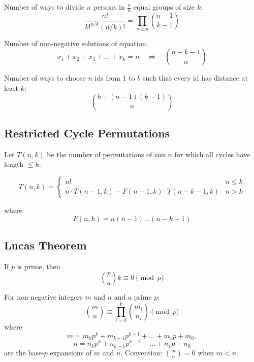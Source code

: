 \documentclass{article}
\begin{document}
Number of ways to divide $n$ persons in $\tfrac{n}{k}$ equal groups of size $k$:
\[
\frac{n!}{k!^{n/k}(n/k)!} = \prod_{n \geq k} \binom{n-1}{k-1}
\]

Number of non-negative solutions of equation:
\[
x_1+x_2+x_3+\dots+x_k=n \quad \Rightarrow \quad \binom{n+k-1}{n}
\]

Number of ways to choose $n$ ids from $1$ to $b$ such that every id has distance at least $k$:
\[
\binom{b-(n-1)(k-1)}{n}
\]


\subsection*{Restricted Cycle Permutations}

Let $T(n,k)$ be the number of permutations of size $n$ for which all cycles have length $\leq k$:

\[
T(n,k) = 
\begin{cases} 
n! & n \leq k \\
n \cdot T(n-1,k) - F(n-1,k)\cdot T(n-k-1,k) & n > k
\end{cases}
\]

where
\[
F(n,k) = n(n-1)\dots(n-k+1)
\]


\subsection*{Lucas Theorem}

If $p$ is prime, then
\[
\binom{p}{a}{k} \equiv 0 \pmod{p}
\]

For non-negative integers $m$ and $n$ and a prime $p$:
\[
\binom{m}{n} \equiv \prod_{i=0}^k \binom{m_i}{n_i} \pmod{p}
\]
where
\[
m = m_k p^k + m_{k-1} p^{k-1} + \dots + m_1 p + m_0,
\]
\[
n = n_k p^k + n_{k-1} p^{k-1} + \dots + n_1 p + n_0
\]
are the base-$p$ expansions of $m$ and $n$.  
Convention: $\binom{m}{n}=0$ when $m<n$.
\end{document}
